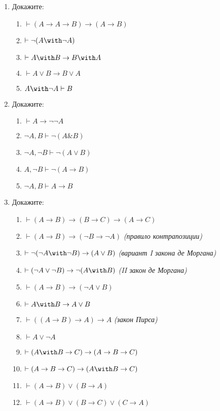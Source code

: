 \documentclass[10pt,a4paper,oneside]{article}
\begin{document}
\begin{enumerate}
\item Докажите:
\begin{enumerate}
\item $\vdash (A \rightarrow A \rightarrow B) \rightarrow (A \rightarrow B)$
\item $\vdash \neg (A \with \neg A)$
\item $\vdash A \with B \rightarrow B \with A$
\item $\vdash A \vee B \rightarrow B \vee A$
\item $A \with \neg A \vdash B$
\end{enumerate}

\item Докажите:
\begin{enumerate}
\item $\vdash A \rightarrow \neg \neg A$
\item $\neg A, B \vdash \neg(A\& B)$
\item $\neg A,\neg B \vdash \neg( A\vee B)$
\item $ A,\neg B \vdash \neg( A\rightarrow B)$
\item $\neg A, B \vdash  A\rightarrow B$
\end{enumerate}

\item Докажите:
\begin{enumerate}
\item $\vdash (A \rightarrow B) \rightarrow (B \rightarrow C) \rightarrow (A \rightarrow C)$ 
\item $\vdash (A \rightarrow B) \rightarrow (\neg B \rightarrow \neg A)$ \emph{(правило контрапозиции)}
\item $\vdash \neg (\neg A \with \neg B) \rightarrow (A \vee B)$ \emph{(вариант I закона де Моргана)}
\item $\vdash (\neg A \vee \neg B) \rightarrow \neg (A \with B)$ \emph{(II закон де Моргана)}
\item $\vdash (A \rightarrow B) \rightarrow (\neg A \vee B)$
\item $\vdash A \with B \rightarrow A \vee B$
\item $\vdash ((A \rightarrow B) \rightarrow A)\rightarrow A$ \emph{(закон Пирса)}
\item $\vdash A \vee \neg A$
\item $\vdash (A \with B \rightarrow C) \rightarrow (A \rightarrow B \rightarrow C)$
\item $\vdash (A \rightarrow B \rightarrow C) \rightarrow (A \with B \rightarrow C)$
\item $\vdash (A \rightarrow B) \vee (B \rightarrow A)$
\item $\vdash (A \rightarrow B) \vee (B \rightarrow C) \vee (C \rightarrow A)$
\end{enumerate}


\end{enumerate}
\end{document}
